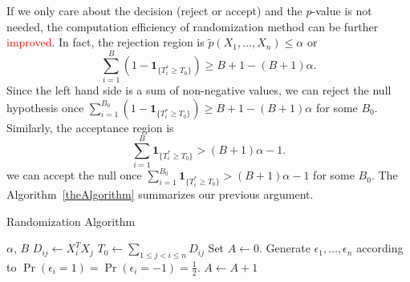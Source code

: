 \documentclass[review]{elsarticle}
\theoremstyle{plain}
\theoremstyle{definition}
\theoremstyle{remark}
\begin{document}
If we only care about the decision (reject or accept) and the $p$-value is not needed, the computation efficiency of randomization method can be further \textcolor{red}{improved}.
In fact, the rejection region is $\tilde{p}(X_1,\ldots, X_n)\leq \alpha$ or
$$\sum_{i=1}^B (1-\mathbf{1}_{\{T_i^*\geq T_0\}})\geq B +1-(B+1)\alpha.$$
Since the left hand side is a sum of non-negative values, we can reject the null hypothesis once $\sum_{i=1}^{B_0} (1-\mathbf{1}_{\{T_i^*\geq T_0\}})\geq B +1-(B+1)\alpha$ for some $B_0$.
Similarly, the acceptance region is
$$\sum_{i=1}^B \mathbf{1}_{\{T_i^*\geq T_0\}}> (B+1)\alpha -1.$$
we can accept the null once
$\sum_{i=1}^{B_0} \mathbf{1}_{\{T_i^*\geq T_0\}}> (B+1)\alpha -1$ for some $B_0$.
The Algorithm~\ref{theAlgorithm} summarizes our previous argument.






\begin{algorithm}
    \caption{Randomization Algorithm}
\label{theAlgorithm}
    \begin{algorithmic}
        \REQUIRE  $\alpha$, $B$
            \STATE $D_{ij}\gets X_i^T X_j$
        \ENDFOR
        \STATE $T_0\gets \sum_{1\leq j<i\leq n}D_{ij}$
        \STATE Set $A\gets 0$.
            \STATE Generate $\epsilon_1,\ldots,\epsilon_n$ according to $\Pr(\epsilon_i=1)=\Pr(\epsilon_i=-1)=\frac{1}{2}$.
            \STATE $A\gets A+1$
                \ENDIF
        \ELSE
            \ENDIF
            \ENDIF
        \ENDFOR
    \end{algorithmic}
\end{algorithm}
\end{document}
